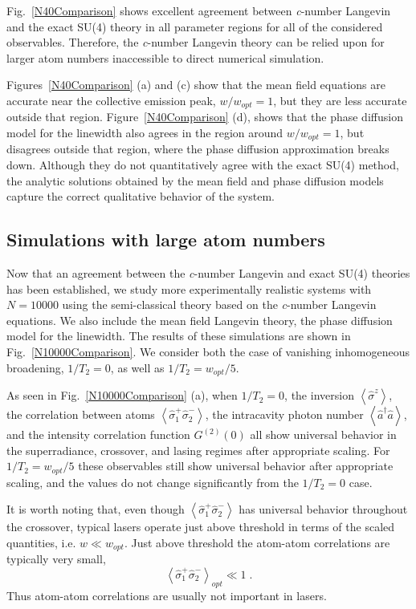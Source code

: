 \documentclass[aps,
twocolumn,
showpacs,
superscriptaddress,groupedaddress]{revtex4}
\begin{document}
Fig.~\ref{N40Comparison} shows excellent agreement between {\it
c}-number Langevin and the exact SU(4) theory in all parameter regions
for all of the considered observables. Therefore, the {\it c}-number
Langevin theory can be relied upon for larger atom numbers inaccessible
to direct numerical simulation.

Figures~\ref{N40Comparison} (a) and (c) show that the mean field
equations are accurate near the collective emission peak, $w/w_{opt}=1$,
but they are less accurate outside that region.
Figure~\ref{N40Comparison} (d), shows that the phase diffusion model for
the linewidth also agrees in the region around $w/w_{opt}=1$, but
disagrees outside that region, where the phase diffusion approximation
breaks down.  Although they do not quantitatively agree with the exact
SU(4) method, the analytic solutions obtained by the mean field and
phase diffusion models capture the correct qualitative behavior of the
system.


\subsection{Simulations with large atom numbers}

Now that an agreement between the {\it c}-number Langevin and exact
SU(4) theories has been established, we study more experimentally
realistic systems with $N=10000$ using the semi-classical theory based
on the {\it c}-number Langevin equations. We also include the mean field
Langevin theory, the phase diffusion model for the linewidth. The
results of these simulations are shown in Fig.~\ref{N10000Comparison}.
We consider both the case of vanishing inhomogeneous broadening,
$1/T_2=0$, as well as $1/T_2=w_{opt}/5$.

As seen in Fig.~\ref{N10000Comparison} (a), when $1/T_2=0$, the
inversion $\left<\hat{\sigma}^{z}\right>$, the correlation between atoms
$\left<\hat{\sigma}_{1}^{+} \hat{\sigma}_{2}^{-}\right>$, the
intracavity photon number  $\left<\hat{a}^{\dagger}\hat{a}\right>$,  and
the intensity correlation function $G^{(2)}(0)$ all show universal
behavior in the superradiance, crossover, and lasing regimes after
appropriate scaling.  For $1/T_2=w_{opt}/5$ these observables still show
universal behavior after appropriate scaling, and the values do not
change significantly from the $1/T_2=0$ case.

It is worth noting that, even though  $\left<\hat{\sigma}_{1}^{+}
\hat{\sigma}_{2}^{-}\right>$ has universal behavior throughout the
crossover, typical lasers operate just above threshold in terms of the
scaled quantities, i.e. $w \ll w_{opt}$.  Just above threshold the
atom-atom correlations are typically very small,
\begin{equation}
\left<\hat{\sigma}_{1}^{+}\hat{\sigma}_{2}^{-}\right>_{opt} \ll 1\;.
\end{equation}
Thus atom-atom correlations are usually not important in lasers.
\end{document}

